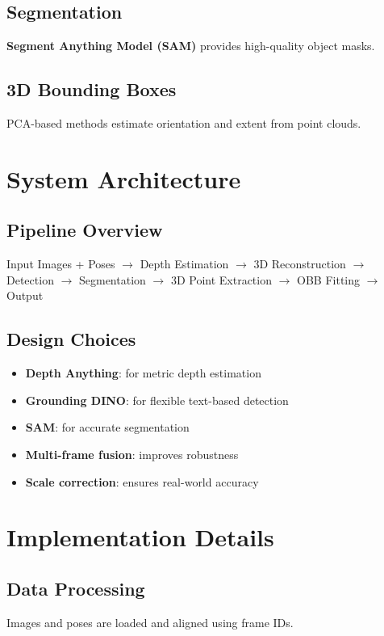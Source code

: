 \documentclass[11pt]{article}
\begin{document}
\subsection{Segmentation}
\textbf{Segment Anything Model (SAM)} provides high-quality object masks.

\subsection{3D Bounding Boxes}
PCA-based methods estimate orientation and extent from point clouds.

\section{System Architecture}

\subsection{Pipeline Overview}

\begin{center}
Input Images + Poses $\rightarrow$ Depth Estimation $\rightarrow$ 3D Reconstruction $\rightarrow$ Detection $\rightarrow$ Segmentation $\rightarrow$ 3D Point Extraction $\rightarrow$ OBB Fitting $\rightarrow$ Output
\end{center}

\subsection{Design Choices}

\begin{itemize}
\item \textbf{Depth Anything}: for metric depth estimation
\item \textbf{Grounding DINO}: for flexible text-based detection
\item \textbf{SAM}: for accurate segmentation
\item \textbf{Multi-frame fusion}: improves robustness
\item \textbf{Scale correction}: ensures real-world accuracy
\end{itemize}

\section{Implementation Details}

\subsection{Data Processing}
Images and poses are loaded and aligned using frame IDs.
\end{document}
